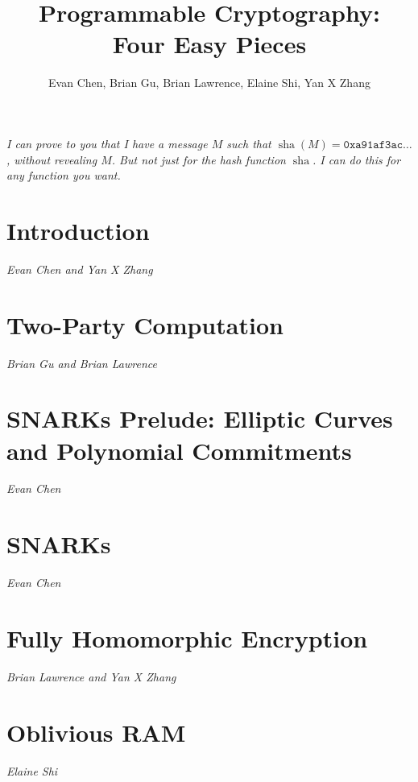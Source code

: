 \documentclass[twoside,openright]{scrreprt}
\title{Programmable Cryptography: \\ Four Easy Pieces}
\author{\parbox{3.5in}{\centering Evan Chen, Brian Gu, Brian Lawrence, Elaine Shi, Yan X Zhang}}
\date{}
\DeclareMathOperator{\sha}{sha}
\newcommand{\credits}[1]{\noindent\emph{#1}\vspace{2em}}
\begin{document}
\maketitle

\begin{titlepage}
  \centering
  \vspace*{5em}
  \begin{minipage}{18em}
  \itshape
  I can prove to you that I have a message $M$ such that
  $\sha(M) = \mathtt{0xa91af3ac}\dots$, without revealing $M$.
  But not just for the hash function $\sha$.
  I can do this for any function you want.
  \end{minipage}
\end{titlepage}

\newpage

\tableofcontents

\chapter{Introduction}
\credits{Evan Chen and Yan X Zhang}


\chapter{Two-Party Computation}
\credits{Brian Gu and Brian Lawrence}




\chapter{SNARKs Prelude: Elliptic Curves and Polynomial Commitments}
\credits{Evan Chen}





\chapter{SNARKs}
\credits{Evan Chen}






\chapter{Fully Homomorphic Encryption}
\credits{Brian Lawrence and Yan X Zhang}






\chapter{Oblivious RAM}
\credits{Elaine Shi}


\end{document}
